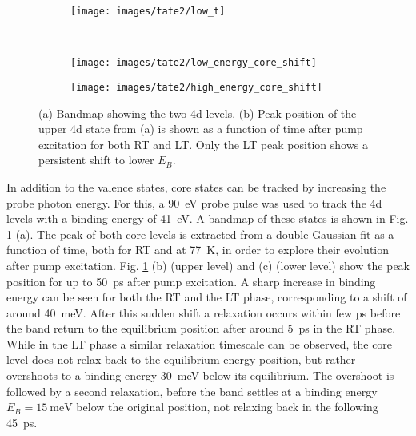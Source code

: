 \begin{figure}[t!]
	\centering
	\begin{subfigure}[b]{0.33\textwidth}
		\texttt{[image: images/tate2/low\_t]}
		\caption{}
	\end{subfigure}
	\\
	\begin{subfigure}[b]{0.49\textwidth}
		\texttt{[image: images/tate2/low\_energy\_core\_shift]}
		\caption{}
	\end{subfigure}
	\hfill
	\begin{subfigure}[b]{0.49\textwidth}
		\texttt{[image: images/tate2/high\_energy\_core\_shift]}
		\caption{}
	\end{subfigure}
	\caption{(a) Bandmap showing the two  4d levels. (b) Peak position of the upper 4d state from (a) is shown as a function of time after pump excitation for both RT and LT. Only the LT peak position shows a persistent shift to lower $E_B$.}
	\label{fig:tate_core}
\end{figure}

In addition to the valence states, core states can be tracked by increasing the probe photon energy.
For this, a \qty{90}{\electronvolt} probe pulse was used to track the  4d levels with a binding energy of \qty{41}{\electronvolt}.
A bandmap of these states is shown in Fig. \ref{fig:tate_core} (a).
The peak of both core levels is extracted from a double Gaussian fit as a function of time, both for RT and at \qty{77}{\kelvin}, in order to explore their evolution after pump excitation.
Fig. \ref{fig:tate_core} (b) (upper level) and (c) (lower level) show the peak position for up to \qty{50}{\pico\second} after pump excitation.
A sharp increase in binding energy can be seen for both the RT and the LT phase, corresponding to a shift of around \qty{40}{\milli\electronvolt}.
After this sudden shift a relaxation occurs within few \unit{\pico\second} before the band return to the equilibrium position after around \qty{5}{\pico\second} in the RT phase.
While in the LT phase a similar relaxation timescale can be observed, the core level does not relax back to the equilibrium energy position, but rather overshoots to a binding energy \qty{30}{\milli\electronvolt} below its equilibrium.
The overshoot is followed by a second relaxation, before the band settles at a binding energy $E_B=\qty{15}{\milli\electronvolt}$ below the original position, not relaxing back in the following \qty{45}{\pico\second}.



